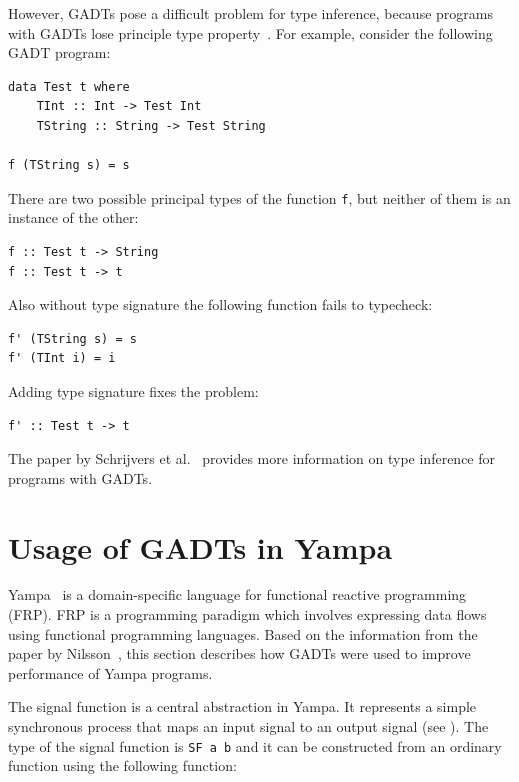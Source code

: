 \documentclass{tmr}
\begin{document}
However, GADTs pose a difficult problem for type inference, because programs with GADTs lose principle type property~\cite{type_inference_gadts}. For example, consider the following GADT program:

\begin{Verbatim}
data Test t where
    TInt :: Int -> Test Int
    TString :: String -> Test String

f (TString s) = s
\end{Verbatim}

There are two possible principal types of the function \verb|f|, but neither of them is an instance of the other:

\begin{Verbatim}
f :: Test t -> String
f :: Test t -> t
\end{Verbatim}

Also without type signature the following function fails to typecheck:

\begin{Verbatim}
f' (TString s) = s
f' (TInt i) = i
\end{Verbatim}

Adding type signature fixes the problem:

\begin{Verbatim}
f' :: Test t -> t
\end{Verbatim}

The paper by Schrijvers et al.~\cite{type_inference_gadts} provides more information on type inference for programs with GADTs.

\section{Usage of GADTs in Yampa}
\label{sec:yampa}

Yampa~\cite{yampa} is a domain-specific language for functional reactive programming (FRP). FRP is a programming paradigm which involves expressing data flows using functional programming languages. Based on the information from the paper by Nilsson~\cite{yampa_gadts}, this section describes how GADTs were used to improve performance of Yampa programs.

The signal function is a central abstraction in Yampa. It represents a simple synchronous process that maps an input signal to an output signal (see ). The type of the signal function is \verb|SF a b| and it can be constructed from an ordinary function using the following function:
\end{document}
